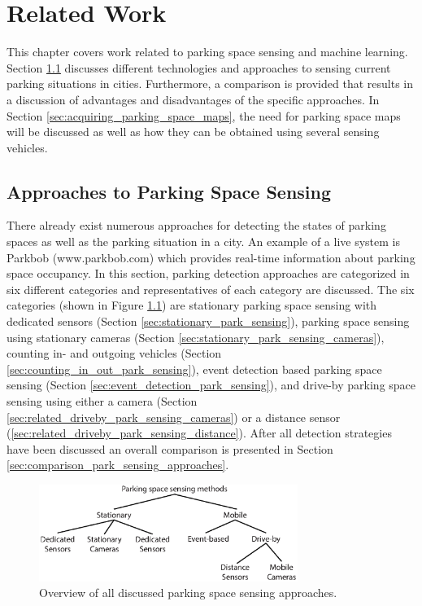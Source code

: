 \chapter{Related Work}
\label{chap:relatedwork}

This chapter covers work related to parking space sensing and machine learning. Section \ref{sec:parksensing} discusses different technologies and approaches to sensing current parking situations in cities. Furthermore, a comparison is provided that results in a discussion of advantages and disadvantages of the specific approaches. In Section \ref{sec:acquiring_parking_space_maps}, the need for parking space maps will be discussed as well as how they can be obtained using several sensing vehicles.



\section{Approaches to Parking Space Sensing}
\label{sec:parksensing}

There already exist numerous approaches for detecting the states of parking spaces as well as the parking situation in a city. An example of a live system is Parkbob (www.parkbob.com) which provides real-time information about parking space occupancy. In this section, parking detection approaches are categorized in six different categories and representatives of each category are discussed. The six categories (shown in Figure \ref{fig:parking_space_sensing_methods}) are stationary parking space sensing with dedicated sensors (Section \ref{sec:stationary_park_sensing}), parking space sensing using stationary cameras (Section \ref{sec:stationary_park_sensing_cameras}), counting in- and outgoing vehicles (Section \ref{sec:counting_in_out_park_sensing}), event detection based parking space sensing (Section \ref{sec:event_detection_park_sensing}), and drive-by parking space sensing using either a camera (Section \ref{sec:related_driveby_park_sensing_cameras}) or a distance sensor (\ref{sec:related_driveby_park_sensing_distance}). After all detection strategies have been discussed an overall comparison is presented in Section \ref{sec:comparison_park_sensing_approaches}.

\begin{figure}
	\centering
	\includegraphics[width=0.75\textwidth]{img/parking_space_sensing_methods.eps}
	\caption{Overview of all discussed parking space sensing approaches.}
	\label{fig:parking_space_sensing_methods}
\end{figure}

